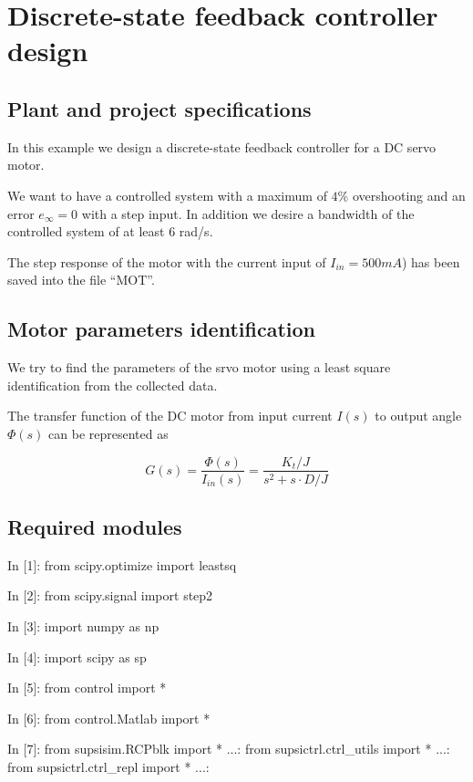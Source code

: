 \section{Discrete-state feedback controller design}

\subsection{Plant and project specifications}

In this example we design a discrete-state feedback controller for a DC servo 
motor. 

We want to have a controlled system with a maximum of $4\%$ 
overshooting and an error $e_{\infty}=0$ with a step input. In addition we 
desire a bandwidth of the controlled system of at least $6$ rad/s.

The step response of the motor with the current input of $I_{in}=500mA$) has 
been saved into the file ``MOT''.

\subsection{Motor parameters identification}

We try to find the parameters of the srvo motor using a least square 
identification from the collected data.

The transfer function of the DC motor from input current $I(s)$ to output angle 
$\Phi(s)$ can be represented as

$$
G(s)=\frac{\Phi(s)}{I_{in}(s)}=\frac{K_t/J}{s^2 + s \cdot D/J}
$$

\subsection{Required modules}

\begin{code}
In [1]: from scipy.optimize import leastsq

In [2]: from scipy.signal import step2

In [3]: import numpy as np

In [4]: import scipy as sp

In [5]: from control import *

In [6]: from control.Matlab import *

In [7]: from supsisim.RCPblk import *
   ...: from supsictrl.ctrl_utils import *
   ...: from supsictrl.ctrl_repl import *
   ...: 

\end{code}

